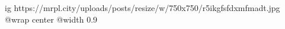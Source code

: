  
 
 
 
 

\ifcmt
  ig https://mrpl.city/uploads/posts/resize/w/750x750/r5ikgfsfdxmfmadt.jpg
  @wrap center
  @width 0.9
\fi
